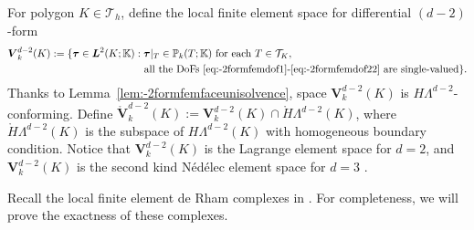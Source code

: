 \documentclass[10pt]{amsart}
\newcommand{\bs}{\boldsymbol}
\numberwithin{equation}{section}
\begin{document}
For polygon $K\in \mathcal T_h$, define the local finite element space for differential $(d-2)$-form  
\begin{align*}  
\boldsymbol{V}_{k}^{d-2}(K):=\{\boldsymbol{\tau}\in\bs L^2(K;\mathbb K)&: \boldsymbol{\tau}|_{T}\in \mathbb P_{k}(T;\mathbb K) \textrm{ for each } T\in\mathcal T_K, \\
&\;\;\textrm{ all the DoFs \eqref{eq:-2formfemdof1}-\eqref{eq:-2formfemdof22} are single-valued}\}.
\end{align*}
Thanks to Lemma~\ref{lem:-2formfemfaceunisolvence}, space $\boldsymbol{V}_{k}^{d-2}(K)$ is $H\Lambda^{d-2}$-conforming.
Define $\mathring{\boldsymbol{V}}_{k}^{d-2}(K):=\boldsymbol{V}_{k}^{d-2}(K)\cap \mathring{H}\Lambda^{d-2}(K)$, where $\mathring{H}\Lambda^{d-2}(K)$ is the subspace of $H\Lambda^{d-2}(K)$ with homogeneous boundary condition.
Notice that
 $\boldsymbol{V}_{k}^{d-2}(K)$ is the Lagrange element space for $d=2$,
and $\boldsymbol{V}_{k}^{d-2}(K)$ is the second kind N\'ed\'elec element space for $d=3$ \cite{Nedelec:1986family}. 

Recall the local finite element de Rham complexes in \cite{ArnoldFalkWinther2006,Arnold2018}.
For completeness, we will prove the exactness of these complexes.
\end{document}

